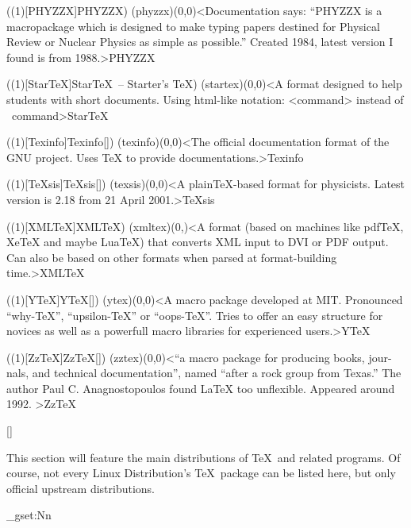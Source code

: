 \tograph(\tostruct(1)[PHYZZX]{PHYZZX}){
	\tonode(phyzzx)(0,0)<Documentation says: “PHYZZX is a macropackage which is designed to make typing papers destined for Physical Review or Nuclear Physics as simple as possible.” Created 1984, latest version I found is from 1988.>{PHYZZX}
}

\tograph(\tostruct(1)[Star\TeX]{Star\TeX\ – Starter's \TeX}){
	\tonode(startex)(0,0)<A format designed to help students with short documents. Using html-like notation: <command> instead of \ command>{Star\TeX}
}

\tograph(\tostruct(1)[Texinfo]{Texinfo}[\normalimportant]){
	\tonode(texinfo)(0,0)<The official documentation format of the GNU project. Uses TeX to provide documentations.>{Texinfo}
}

\tograph(\tostruct(1)[TeXsis]{\TeX sis}[\normalimportant]){
	\tonode(texsis)(0,0)<A plainTeX-based format for physicists. Latest version is 2.18 from 21 April 2001.>{\TeX sis}
}

\tograph(\tostruct(1)[XML\TeX]{XML\TeX}){
  \tonode(xmltex)(0,\layer)<A format (based on machines like pdfTeX, XeTeX and maybe LuaTeX) that converts XML input to DVI or PDF output. Can also be based on other formats when parsed at format-building time.>{XML\TeX}
}

\tograph(\tostruct(1)[Y\TeX]{Y\TeX}[\experimental]){
	\tonode(ytex)(0,0)<A macro package developed at MIT. Pronounced “why-TeX”, “upsilon-TeX” or “oops-TeX”. Tries to offer an easy structure for novices as well as a powerfull macro libraries for experienced users.>{Y\TeX}
}

\tograph(\tostruct(1)[Zz\TeX]{Zz\TeX}[\normalimportant]){
	\tonode(zztex)(0,0)<“a macro package for producing books, jour-
nals, and technical documentation”, named “after a rock group from Texas.” The author Paul C. Anagnostopoulos found LaTeX too unflexible. Appeared around 1992.
>{Zz\TeX}
}

\clearpage

[\distro]
\parbox{\textwidth}{\normalsize
This section will feature the main distributions of \TeX\ and related programs. Of course, not every Linux Distribution's \TeX\ package can be listed here, but only official upstream distributions.
}

\ExplSyntaxOn
\fp_gset:Nn
\ExplSyntaxOff

